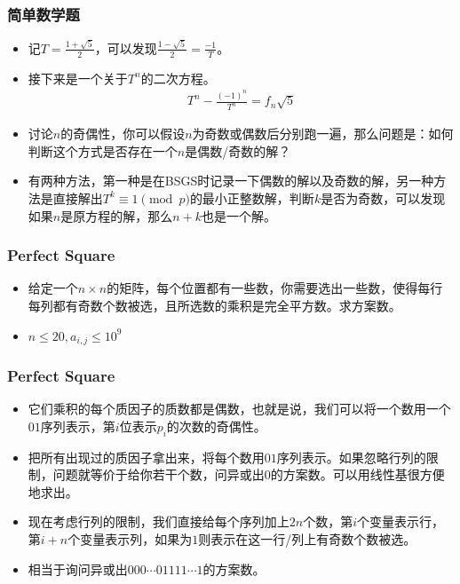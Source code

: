 \documentclass{beamer}
\begin{document}
\begin{frame}
    \frametitle{简单数学题}
    \begin{itemize}
        \item 记$T = \frac{1 + \sqrt 5}{2}$，可以发现$\frac{1 - \sqrt 5}{2} = \frac {-1}T$。
        \item 接下来是一个关于$T^n$的二次方程。
        $$\begin{aligned}
            T^n - \frac{(-1)^n}{T^n} = f_n\sqrt 5
        \end{aligned}$$
        \item 讨论$n$的奇偶性，你可以假设$n$为奇数或偶数后分别跑一遍，那么问题是：如何判断这个方式是否存在一个$n$是偶数/奇数的解？
        \item 有两种方法，第一种是在BSGS时记录一下偶数的解以及奇数的解，另一种方法是直接解出$T^k\equiv 1\pmod p$的最小正整数解，判断$k$是否为奇数，可以发现如果$n$是原方程的解，那么$n + k$也是一个解。
    \end{itemize}
\end{frame}

\begin{frame}
    \frametitle{Perfect Square}
    \begin{itemize}
        \item 给定一个$n\times n$的矩阵，每个位置都有一些数，你需要选出一些数，使得每行每列都有奇数个数被选，且所选数的乘积是完全平方数。求方案数。
        \item $n\leq 20, a_{i, j}\leq 10^9$
    \end{itemize}
\end{frame}

\begin{frame}
    \frametitle{Perfect Square}
    \begin{itemize}
        \item 它们乘积的每个质因子的质数都是偶数，也就是说，我们可以将一个数用一个$01$序列表示，第$i$位表示$p_i$的次数的奇偶性。
        \item 把所有出现过的质因子拿出来，将每个数用$01$序列表示。如果忽略行列的限制，问题就等价于给你若干个数，问异或出$0$的方案数。可以用线性基很方便地求出。
        \item 现在考虑行列的限制，我们直接给每个序列加上$2n$个数，第$i$个变量表示行，第$i + n$个变量表示列，如果为$1$则表示在这一行/列上有奇数个数被选。
        \item 相当于询问异或出$000\cdots01111\cdots 1$的方案数。
    \end{itemize}
\end{frame}
\end{document}
